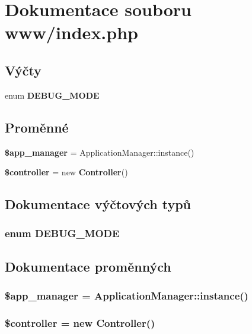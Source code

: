 \section{Dokumentace souboru www/index.php}
\label{d8/dcd/www_2index_8php}
\subsection*{Výčty}
\begin{DoxyCompactItemize}
\item 
enum {\bf DEBUG\_\-MODE} 
\end{DoxyCompactItemize}
\subsection*{Proměnné}
\begin{DoxyCompactItemize}
\item 
{\bf \$app\_\-manager} = ApplicationManager::instance()
\item 
{\bf \$controller} = new {\bf Controller}()
\end{DoxyCompactItemize}


\subsection{Dokumentace výčtových typů}
\subsubsection[{DEBUG\_\-MODE}]{\setlength{\rightskip}{0pt plus 5cm}enum {\bf DEBUG\_\-MODE}}\label{d8/dcd/www_2index_8php_a84cb21ca8841a588311a03bd9c054d76}


\subsection{Dokumentace proměnných}
\subsubsection[{\$app\_\-manager}]{\setlength{\rightskip}{0pt plus 5cm}\$app\_\-manager = ApplicationManager::instance()}\label{d8/dcd/www_2index_8php_ae90535e0d6f8ef2796b9df91694cc337}
\subsubsection[{\$controller}]{\setlength{\rightskip}{0pt plus 5cm}\$controller = new {\bf Controller}()}\label{d8/dcd/www_2index_8php_a388ef7b1db5e6f728e63cee704ce6e23}
